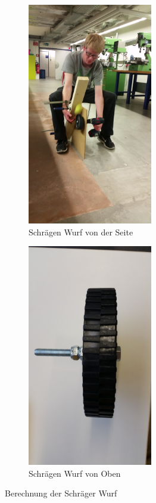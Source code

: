 \begin{figure}[h!]
	\centering
	\begin{subfigure}{.4\textwidth}
		\centering
		\includegraphics[width=0.6\textwidth]{../../fig/Versuch_Drehrad.png}
		\caption{Schrägen Wurf von der Seite}
		\label{fig:Aufbau der Versuch}
	\end{subfigure} %
	\begin{subfigure}{.4\textwidth}
		\centering
		\includegraphics[width=0.6\textwidth]{../../fig/Drehrad_1.jpg}
		\caption{Schrägen Wurf von Oben}
		\label{fig:Drehrad}
	\end{subfigure}
	\caption{Berechnung der Schräger Wurf}
	\label{Drehrad Versuch}
\end{figure}

